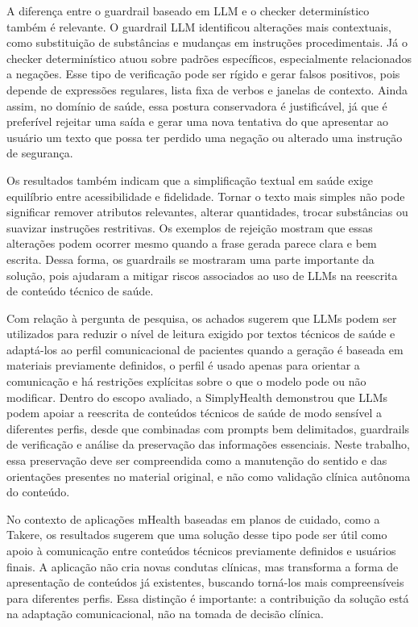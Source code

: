 A diferença entre o guardrail baseado em LLM e o checker determinístico também é relevante. O guardrail LLM identificou alterações mais contextuais, como substituição de substâncias e mudanças em instruções procedimentais. Já o checker determinístico atuou sobre padrões específicos, especialmente relacionados a negações. Esse tipo de verificação pode ser rígido e gerar falsos positivos, pois depende de expressões regulares, lista fixa de verbos e janelas de contexto. Ainda assim, no domínio de saúde, essa postura conservadora é justificável, já que é preferível rejeitar uma saída e gerar uma nova tentativa do que apresentar ao usuário um texto que possa ter perdido uma negação ou alterado uma instrução de segurança.

Os resultados também indicam que a simplificação textual em saúde exige equilíbrio entre acessibilidade e fidelidade. Tornar o texto mais simples não pode significar remover atributos relevantes, alterar quantidades, trocar substâncias ou suavizar instruções restritivas. Os exemplos de rejeição mostram que essas alterações podem ocorrer mesmo quando a frase gerada parece clara e bem escrita. Dessa forma, os guardrails se mostraram uma parte importante da solução, pois ajudaram a mitigar riscos associados ao uso de LLMs na reescrita de conteúdo técnico de saúde.

Com relação à pergunta de pesquisa, os achados sugerem que LLMs podem ser utilizados para reduzir o nível de leitura exigido por textos técnicos de saúde e adaptá-los ao perfil comunicacional de pacientes quando a geração é baseada em materiais previamente definidos, o perfil é usado apenas para orientar a comunicação e há restrições explícitas sobre o que o modelo pode ou não modificar. Dentro do escopo avaliado, a SimplyHealth demonstrou que LLMs podem apoiar a reescrita de conteúdos técnicos de saúde de modo sensível a diferentes perfis, desde que combinadas com prompts bem delimitados, guardrails de verificação e análise da preservação das informações essenciais. Neste trabalho, essa preservação deve ser compreendida como a manutenção do sentido e das orientações presentes no material original, e não como validação clínica autônoma do conteúdo.

No contexto de aplicações mHealth baseadas em planos de cuidado, como a Takere, os resultados sugerem que uma solução desse tipo pode ser útil como apoio à comunicação entre conteúdos técnicos previamente definidos e usuários finais. A aplicação não cria novas condutas clínicas, mas transforma a forma de apresentação de conteúdos já existentes, buscando torná-los mais compreensíveis para diferentes perfis. Essa distinção é importante: a contribuição da solução está na adaptação comunicacional, não na tomada de decisão clínica.


